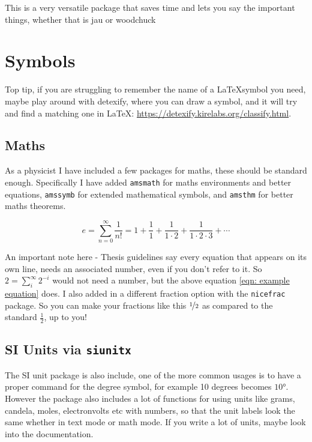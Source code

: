 \documentclass[../HWThesis.tex]{subfiles} %
\begin{document}
\begin{refsection}
This is a very versatile package that saves time and lets you say the important things, whether that is  \ac{jau} or \ac{woodchuck}

\section{Symbols}
Top tip, if you are struggling to remember the name of a \LaTeX symbol you need, maybe play around with detexify, where you can draw a symbol, and it will try and find a matching one in \LaTeX: \url{https://detexify.kirelabs.org/classify.html}. 

\subsection{Maths}
As a physicist I have included a few packages for maths, these should be standard enough. Specifically I have added \texttt{amsmath} for maths environments and better equations, \texttt{amssymb} for extended mathematical symbols, and \texttt{amsthm} for better maths theorems. 

\begin{equation}
e =  \sum\limits_{n = 0}^{\infty} \frac{1}{n!} = 1 + \frac{1}{1} + \frac{1}{1\cdot 2} + \frac{1}{1\cdot 2\cdot 3} + \cdots
\label{eqn: example equation}
\end{equation}

An important note here - Thesis guidelines say every equation that appears on its own line, needs an associated number, even if you don't refer to it. So $2 = \sum_i^\infty 2^{-i}$ would not need a number, but the above equation \ref{eqn: example equation} does. I also added in a different fraction option with the \texttt{nicefrac} package. So you can make your fractions like this $\nicefrac{1}{2}$ as compared to the standard $\frac{1}{2}$, up to you!

\subsection{SI Units via \texttt{siunitx}}

The SI unit package is also include, one of the more common usages is to have a proper command for the degree symbol, for example 10 degrees becomes \(\ang{10}\). However the package also includes a lot of functions for using units like grams, candela, moles, electronvolts etc with numbers, so that the unit labels look the same whether in text mode or math mode. If you write a lot of units, maybe look into the documentation. 


\end{refsection}
\end{document}
